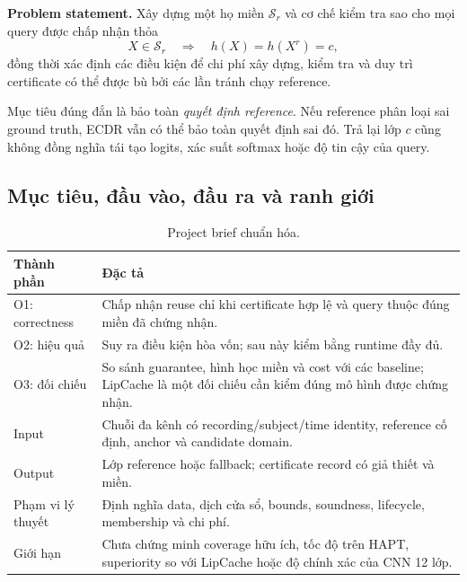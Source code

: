 \documentclass[11pt,a4paper]{article}
\newcommand{\Sset}{\mathcal S}
\theoremstyle{remark}
\begin{document}
\textbf{Problem statement.} Xây dựng một họ miền $\Sset_r$ và cơ chế kiểm tra
sao cho mọi query được chấp nhận thỏa
\begin{equation}
 X\in\Sset_r\quad\Longrightarrow\quad h(X)=h(X^r)=c,
 \label{eq:target}
\end{equation}
đồng thời xác định các điều kiện để chi phí xây dựng, kiểm tra và duy trì
certificate có thể được bù bởi các lần tránh chạy reference.

Mục tiêu đúng đắn là bảo toàn \emph{quyết định reference}. Nếu reference
phân loại sai ground truth, ECDR vẫn có thể bảo toàn quyết định sai đó. Trả
lại lớp $c$ cũng không đồng nghĩa tái tạo logits, xác suất softmax hoặc độ
tin cậy của query.

\subsection{Mục tiêu, đầu vào, đầu ra và ranh giới}
\begin{table}[!htbp]\centering
\caption{Project brief chuẩn hóa.}
\begin{tabularx}{\linewidth}{@{}p{2.5cm}Y@{}}\toprule
Thành phần & Đặc tả\\\midrule
O1: correctness & Chấp nhận reuse chỉ khi certificate hợp lệ và query thuộc
đúng miền đã chứng nhận.\\
O2: hiệu quả & Suy ra điều kiện hòa vốn; sau này kiểm bằng runtime đầy đủ.\\
O3: đối chiếu & So sánh guarantee, hình học miền và cost với các baseline;
LipCache là một đối chiếu cần kiểm đúng mô hình được chứng nhận.\\
Input & Chuỗi đa kênh có recording/subject/time identity, reference cố định,
anchor và candidate domain.\\
Output & Lớp reference hoặc fallback; certificate record có giả thiết và miền.\\
Phạm vi lý thuyết & Định nghĩa data, dịch cửa sổ, bounds, soundness, lifecycle,
membership và chi phí.\\
Giới hạn & Chưa chứng minh coverage hữu ích, tốc độ trên HAPT, superiority
so với LipCache hoặc độ chính xác của CNN 12 lớp.\\\bottomrule
\end{tabularx}
\end{table}
\end{document}
